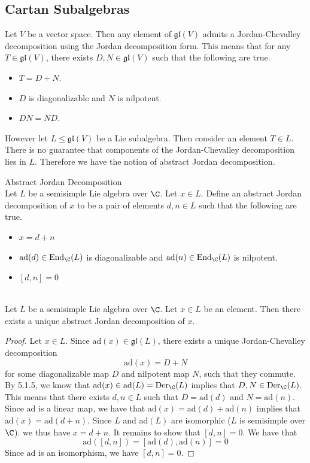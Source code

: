 \documentclass[a4paper]{article}
\begin{document}
\subsection{Cartan Subalgebras}
Let $V$ be a vector space. Then any element of $\mathfrak{gl}(V)$ admits a Jordan-Chevalley decomposition using the Jordan decomposition form. This means that for any $T\in\mathfrak{gl}(V)$, there exists $D,N\in\mathfrak{gl}(V)$ such that the following are true. 
\begin{itemize}
\item $T=D+N$. 
\item $D$ is diagonalizable and $N$ is nilpotent. 
\item $DN=ND$. 
\end{itemize}

However let $L\leq\mathfrak{gl}(V)$ be a Lie subalgebra. Then consider an element $T\in L$. There is no guarantee that components of the Jordan-Chevalley decomposition lies in $L$. Therefore we have the notion of abstract Jordan decomposition. 

\begin{defn}{Abstract Jordan Decomposition}{} \\Let $L$ be a semisimple Lie algebra over $\C$. Let $x\in L$. Define an abstract Jordan decomposition of $x$ to be a pair of elements $d,n\in L$ such that the following are true. 
\begin{itemize}
\item $x=d+n$
\item $\text{ad}(d)\in\text{End}_\C(L)$ is diagonalizable and $\text{ad}(n)\in\text{End}_\C(L)$ is nilpotent. 
\item $[d,n]=0$
\end{itemize}
\end{defn}

\begin{lmm}{}{} \\Let $L$ be a semisimple Lie algebra over $\C$. Let $x\in L$ be an element. Then there exists a unique abstract Jordan decomposition of $x$. 
\begin{proof}
Let $x\in L$. Since $\text{ad}(x)\in\mathfrak{gl}(L)$, there exists a unique Jordan-Chevalley decomposition $$\text{ad}(x)=D+N$$ for some diagonalizable map $D$ and nilpotent map $N$, such that they commute. By 5.1.5, we know that $\text{ad}(x)\in\text{ad}(L)=\text{Der}_\C(L)$ implies that $D,N\in\text{Der}_\C(L)$. This means that there exists $d,n\in L$ such that $D=\text{ad}(d)$ and $N=\text{ad}(n)$. Since $\text{ad}$ is a linear map, we have that $\text{ad}(x)=\text{ad}(d)+\text{ad}(n)$ implies that $\text{ad}(x)=\text{ad}(d+n)$. Since $L$ and $\text{ad}(L)$ are isomorphic ($L$ is semisimple over $\C$). we thus have $x=d+n$. It remains to show that $[d,n]=0$. We have that $$\text{ad}([d,n])=[\text{ad}(d),\text{ad}(n)]=0$$ Since $\text{ad}$ is an isomorphism, we have $[d,n]=0$. 
\end{proof}
\end{lmm}
\end{document}

